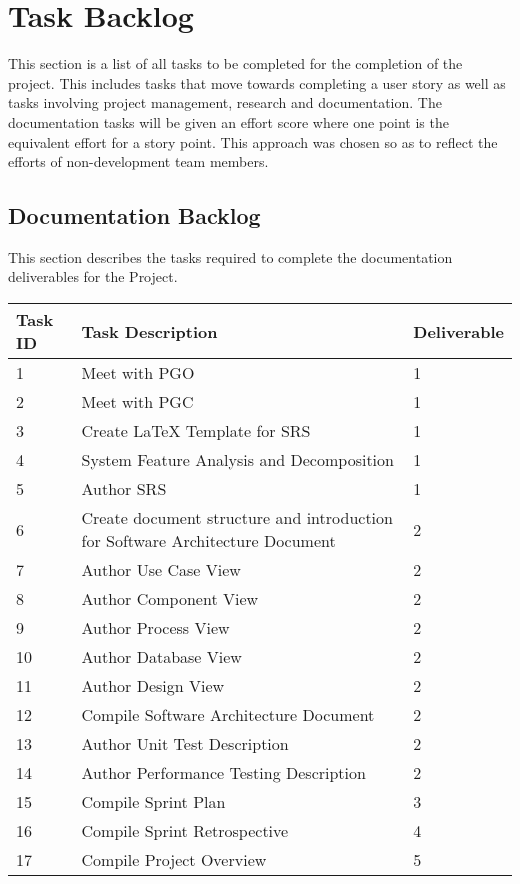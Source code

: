 \documentclass[11pt]{article}
\begin{document}
\section{Task Backlog}
This section is a list of all tasks to be completed for the completion of the project. This includes tasks that move towards completing a user story as well as tasks involving project management, research and documentation. The documentation tasks will be given an effort score where one point is the equivalent effort for a story point. This approach was chosen so as to reflect the efforts of non-development team members.
\subsection{Documentation Backlog}
This section describes the tasks required to complete the documentation deliverables for the Project.
\begin{table}[H]
		\hskip-3.0cm\begin{tabular}{@{}|l|l|l|@{}}
		\toprule
		\textbf{Task ID} & \textbf{Task Description} & \textbf{Deliverable} \\ \midrule
1		& Meet with PGO          & 1    \\ \midrule
2		& Meet with PGC & 1       \\ \midrule
3		& Create LaTeX Template for SRS& 1               \\ \midrule
4		& System Feature Analysis and Decomposition                 & 1               \\ \midrule
5		& Author SRS                 & 1               \\ \midrule
6		& Create document structure and introduction for Software Architecture Document & 2               \\ \midrule
7		& Author Use Case View                & 2             \\ \midrule
8		& Author Component View&               2\\ \midrule
9		& Author Process View&             2  \\ \midrule
10		& Author Database View &            2   \\ \midrule
11		& Author Design View&              2 \\ \midrule
12		& Compile Software Architecture Document& 2              \\ \midrule
13		&Author Unit Test Description          &2   \\ \midrule
14		&Author Performance Testing Description           &2     \\ \midrule
15		& Compile Sprint Plan & 3        \\ \midrule
16		& Compile Sprint Retrospective          &4     \\ \midrule
17		& Compile Project Overview                 &  5  \\ \bottomrule
	\end{tabular}
\end{table}
\end{document}
